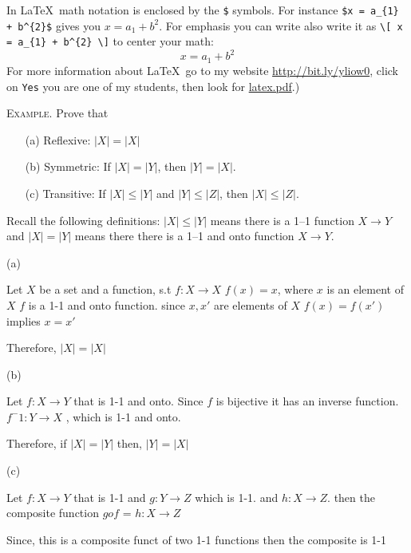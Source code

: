 

\renewcommand\AUTHOR{nweadick1@cougars.ccis.edu} %


\topmattertwo

In \LaTeX\, math notation is enclosed by the \verb!$! symbols.
For instance \verb!$x = a_{1} + b^{2}$! gives you $x = a_{1} + b^{2}$.
For emphasis you can write also write it as
\verb!\[ x = a_{1} + b^{2} \]!
to center your math:
\[
x = a_{1} + b^{2}
\]
For more information about \LaTeX\, go to my
website
\href{http://bit.ly/yliow0}{http://bit.ly/yliow0},
click on \verb!Yes!
you are one of my students,
then look for
\href{https://drive.google.com/file/d/0BzjYrK0VFuMWZm5xV0kyR3J2Zm8/view?usp=sharing}{latex.pdf}.)

\newpage
\textsc{Example.}
Prove that
\begin{enumerate}[nosep]
\item[(a)] Reflexive: $|X| = |X|$
\item[(b)] Symmetric: If $|X| = |Y|$, then $|Y| = |X|$.
\item[(c)] Transitive: If $|X| \leq |Y|$ and $|Y| \leq |Z|$, then
$|X| \leq |Z|$.
\end{enumerate}

Recall the following definitions:
$|X| \leq |Y|$ means there is a 1--1 function $X \rightarrow Y$
and $|X| = |Y|$ means there there is a 1--1 and onto function $X \rightarrow Y$.

\SOLUTION

(a)

Let $X$ be a set and a function, s.t $f:X \rightarrow X$
$f(x)=x$, where $x$ is an element of $X$
$f$ is a 1-1 and onto function. 
since $x,x'$ are elements of $X$
$f(x) = f(x')$ implies $x=x'$

Therefore, $|X| = |X|$

(b) 

Let $f:X \rightarrow Y$ that is 1-1 and onto. Since $f$ is bijective it has an inverse function.
$f^-1: Y \rightarrow X$ , which is 1-1 and onto. 

Therefore, if $|X| = |Y|$ then, $|Y| = |X|$

(c)

Let $f:X \rightarrow Y$ that is 1-1 and $g:Y \rightarrow Z$ which is 1-1. and $h:X \rightarrow Z$.
then the composite function $gof$ = $h:X \rightarrow Z$

Since, this is a composite funct of two 1-1 functions then the composite is 1-1

